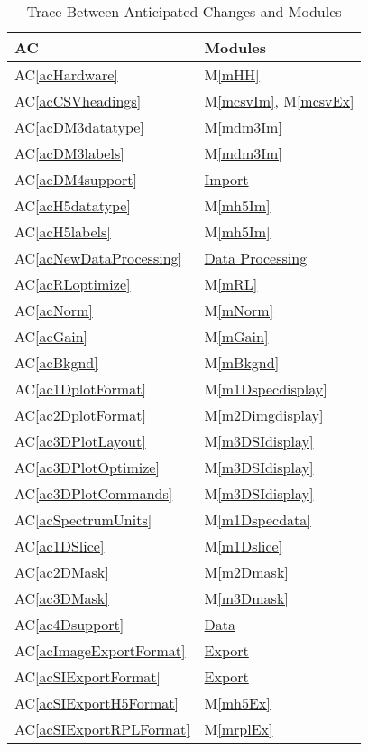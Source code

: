 \documentclass[12pt, titlepage]{article}
\newcommand{\acref}[1]{AC\ref{#1}}
\newcommand{\mref}[1]{M\ref{#1}}
\begin{document}
\begin{table}[H]
\centering
\begin{tabular}{p{} p{}}
	\toprule
	\textbf{AC} & \textbf{Modules}\\
	\midrule
	\acref{acHardware} & \mref{mHH}\\
	\acref{acCSVheadings} & \mref{mcsvIm}, \mref{mcsvEx}\\
	\acref{acDM3datatype} & \mref{mdm3Im}\\
	\acref{acDM3labels} & \mref{mdm3Im}\\
	\acref{acDM4support} & \hyperref[sssec:Import]{Import}\\
	\acref{acH5datatype} & \mref{mh5Im}\\
	\acref{acH5labels} & \mref{mh5Im}\\
	\acref{acNewDataProcessing} & \hyperref[ssec:DataProc]{Data Processing}\\
	\acref{acRLoptimize} & \mref{mRL}\\
	\acref{acNorm} & \mref{mNorm}\\
	\acref{acGain} & \mref{mGain}\\
	\acref{acBkgnd} & \mref{mBkgnd}\\
	\acref{ac1DplotFormat} & \mref{m1Dspecdisplay}\\
	\acref{ac2DplotFormat} & \mref{m2Dimgdisplay}\\
	\acref{ac3DPlotLayout} & \mref{m3DSIdisplay}\\
	\acref{ac3DPlotOptimize} & \mref{m3DSIdisplay}\\
	\acref{ac3DPlotCommands} & \mref{m3DSIdisplay}\\
	\acref{acSpectrumUnits} & \mref{m1Dspecdata}\\
	\acref{ac1DSlice} & \mref{m1Dslice}\\
	\acref{ac2DMask} & \mref{m2Dmask}\\
	\acref{ac3DMask} & \mref{m3Dmask}\\
	\acref{ac4Dsupport} & \hyperref[sssec:Data]{Data}\\
	\acref{acImageExportFormat} & \hyperref[sssec:Export]{Export}\\
	\acref{acSIExportFormat} & \hyperref[sssec:Export]{Export}\\
	\acref{acSIExportH5Format} & \mref{mh5Ex}\\
	\acref{acSIExportRPLFormat} & \mref{mrplEx}\\
	\bottomrule
\end{tabular}
\caption{Trace Between Anticipated Changes and Modules}
\label{TblACT}
\end{table}
\end{document}
